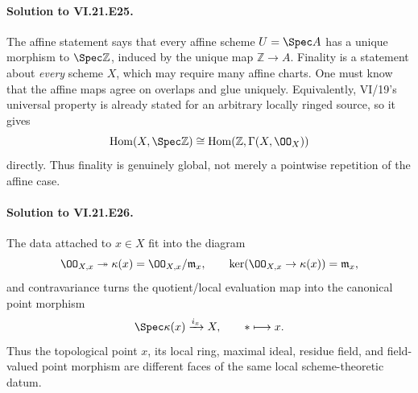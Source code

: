 \paragraph{Solution to VI.21.E25.}
\begin{solution}
The affine statement says that every affine scheme $U=\Spec A$ has a unique morphism to
$\Spec\mathbb Z$, induced by the unique map $\mathbb Z\to A$.  Finality is a statement about
\emph{every} scheme $X$, which may require many affine charts.  One must know that the affine maps
agree on overlaps and glue uniquely.  Equivalently, VI/19's universal property is already stated
for an arbitrary locally ringed source, so it gives
\[
\operatorname{Hom}(X,\Spec\mathbb Z)
\cong\operatorname{Hom}(\mathbb Z,\Gamma(X,\OO_X))
\]
directly.  Thus finality is genuinely global, not merely a pointwise repetition of the affine
case.
\end{solution}

\paragraph{Solution to VI.21.E26.}
\begin{solution}
The data attached to $x\in X$ fit into the diagram
\[
\OO_{X,x}\twoheadrightarrow
\kappa(x)=\OO_{X,x}/\mathfrak m_x,
\qquad
\ker(\OO_{X,x}\to\kappa(x))=\mathfrak m_x,
\]
and contravariance turns the quotient/local evaluation map into the canonical point morphism
\[
\Spec\kappa(x)\xrightarrow{i_x}X,
\qquad *\longmapsto x.
\]
Thus the topological point $x$, its local ring, maximal ideal, residue field, and field-valued point
morphism are different faces of the same local scheme-theoretic datum.
\end{solution}

